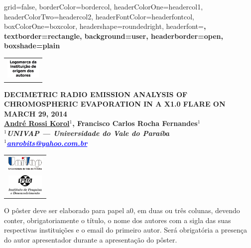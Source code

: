 \documentclass[a0paper,portrait]{baposter}
\begin{document}
\begin{poster}
{grid=false,
borderColor=bordercol, %
headerColorOne=headercol1, %
headerColorTwo=headercol2, %
headerFontColor=headerfontcol, %
boxColorOne=boxcolor, %
headershape=roundedright, %
headerfont=\Large\sf\bf, %
textborder=rectangle,
background=user,
headerborder=open, %
boxshade=plain
}
{\begin{tabular}{c} \includegraphics[height=1cm]{logomarca.png}\\
\end{tabular}
}  
%
%
{\bf  \LARGE {DECIMETRIC RADIO EMISSION ANALYSIS OF CHROMOSPHERIC EVAPORATION IN A X1.0 FLARE ON MARCH 29, 2014} \\ %
\vspace{0.2cm} 
\footnotesize \underline{André Rossi Korol}$^1$, Francisco Carlos Rocha Fernandes$^1$\\  %
\footnotesize $^1$\it UNIVAP --- Universidade do Vale do Paraíba\\ %
\footnotesize $^1$\it \textcolor{blue}{\underline{anrobits@yahoo.com.br}}\/}

{\begin{tabular}{c} \includegraphics[height=0.75cm]{UNIVAP-SF.png}\\
\includegraphics[height=1cm]{ipd2-sf.png}
\end{tabular}
}  

{O pôster deve ser elaborado para papel a0, em duas ou três colunas, devendo conter, obrigatoriamente o título, o nome dos autores com a sigla das suas respectivas instituições e o email do primeiro autor. 
Será obrigatória a presença do autor apresentador durante a apresentação do pôster.


}
\end{poster}
\end{document}
